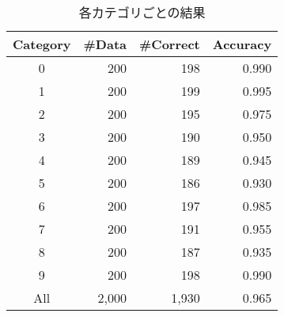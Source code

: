\documentclass[class=jsarticle, crop=false, dvipdfmx, fleqn]{standalone}
\begin{document}
\begin{table}[H]
	\centering
	\caption{各カテゴリごとの結果}
	\begin{tabular}{crrr}
		Category & {\#}Data & {\#}Correct & Accuracy \\ \hline
		0 & 200 & 198 & 0.990 \\
		1 & 200 & 199 & 0.995 \\
		2 & 200 & 195 & 0.975 \\
		3 & 200 & 190 & 0.950 \\
		4 & 200 & 189 & 0.945 \\
		5 & 200 & 186 & 0.930 \\
		6 & 200 & 197 & 0.985 \\
		7 & 200 & 191 & 0.955 \\
		8 & 200 & 187 & 0.935 \\
		9 & 200 & 198 & 0.990 \\
		All & 2,000 & 1,930 & 0.965
	\end{tabular}
	\label{tab:result}
\end{table}
\end{document}
